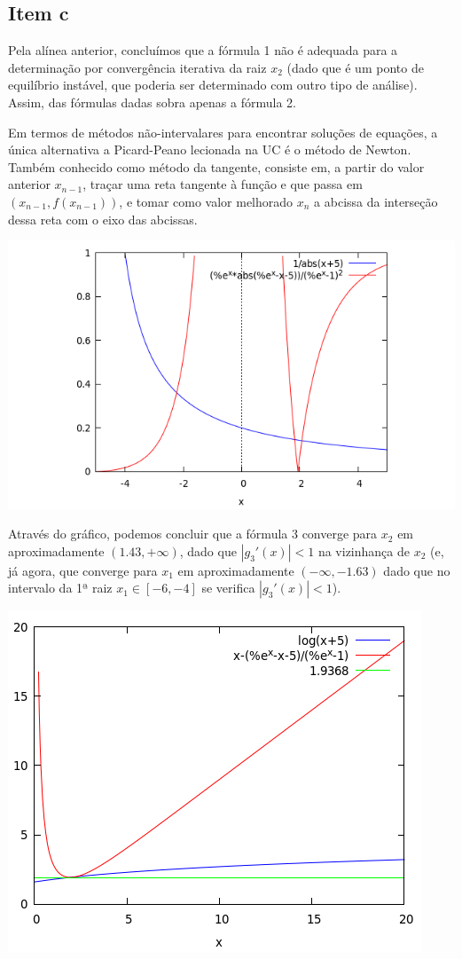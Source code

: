 {\subsection{Item c}
Pela alínea anterior, concluímos que a fórmula 1 não é adequada para a determinação por convergência iterativa da raiz $x_2$ (dado que é um ponto de equilíbrio instável, que poderia ser determinado com outro tipo de análise). Assim, das fórmulas dadas sobra apenas a fórmula 2.\par
Em termos de métodos não-intervalares para encontrar soluções de equações, a única alternativa a Picard-Peano lecionada na UC é o método de Newton. Também conhecido como método da tangente, consiste em, a partir do valor anterior $x_{n-1}$, traçar uma reta tangente à função e que passa em $(x_{n-1}, f(x_{n-1}))$, e tomar como valor melhorado $x_n$ a abcissa da interseção dessa reta com o eixo das abcissas.

\begin{center} \includegraphics[scale=0.5]{2017E_3_3} \end{center}
Através do gráfico, podemos concluir que a fórmula 3 converge para $x_2$ em aproximadamente $(1.43, +\infty)$, dado que $|g_3'(x)|<1$ na vizinhança de $x_2$ (e, já agora, que converge para $x_1$ em aproximadamente $(-\infty, -1.63)$ dado que no intervalo da 1ª raiz $x_1 \in [-6,-4]$ se verifica $|g_3'(x)|<1$).
\begin{center} 
\includegraphics[scale=0.45]{2017E_3_3_02}

\end{center}}
